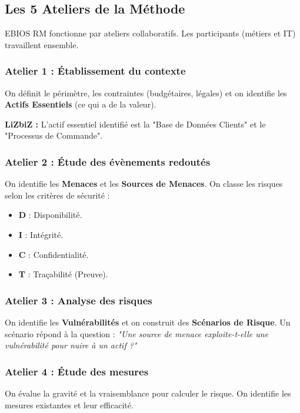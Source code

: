\subsection{Les 5 Ateliers de la Méthode}

EBIOS RM fonctionne par ateliers collaboratifs. Les participants (métiers et IT) travaillent ensemble.

\subsubsection{Atelier 1 : Établissement du contexte}
On définit le périmètre, les contraintes (budgétaires, légales) et on identifie les \textbf{Actifs Essentiels} (ce qui a de la valeur).
\begin{boxlizbiz}
\textbf{LiZbiZ :} L'actif essentiel identifié est la "Base de Données Clients" et le "Processus de Commande".
\end{boxlizbiz}

\subsubsection{Atelier 2 : Étude des évènements redoutés}
On identifie les \textbf{Menaces} et les \textbf{Sources de Menaces}. On classe les risques selon les critères de sécurité :
\begin{itemize}
    \item \textbf{D} : Disponibilité.
    \item \textbf{I} : Intégrité.
    \item \textbf{C} : Confidentialité.
    \item \textbf{T} : Traçabilité (Preuve).
\end{itemize}

\subsubsection{Atelier 3 : Analyse des risques}
On identifie les \textbf{Vulnérabilités} et on construit des \textbf{Scénarios de Risque}.
Un scénario répond à la question : \textit{"Une source de menace exploite-t-elle une vulnérabilité pour nuire à un actif ?"}

\subsubsection{Atelier 4 : Étude des mesures}
On évalue la gravité et la vraisemblance pour calculer le risque. On identifie les mesures existantes et leur efficacité.

